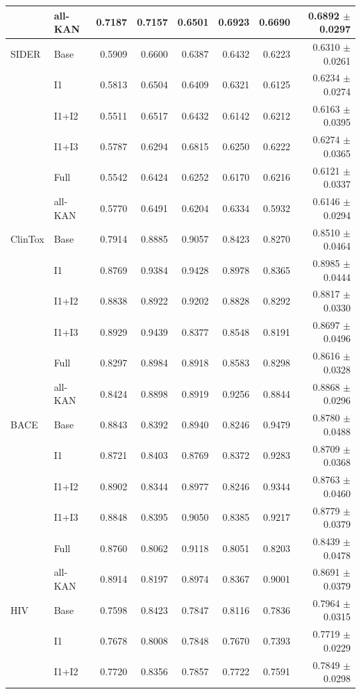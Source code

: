 \begin{landscape}
\begin{longtable}{llrrrrrr}
 & all-KAN & 0.7187 & 0.7157 & 0.6501 & 0.6923 & 0.6690 & 0.6892 $\pm$ 0.0297 \\
\midrule
SIDER & Base & 0.5909 & 0.6600 & 0.6387 & 0.6432 & 0.6223 & 0.6310 $\pm$ 0.0261 \\
 & I1 & 0.5813 & 0.6504 & 0.6409 & 0.6321 & 0.6125 & 0.6234 $\pm$ 0.0274 \\
 & I1+I2 & 0.5511 & 0.6517 & 0.6432 & 0.6142 & 0.6212 & 0.6163 $\pm$ 0.0395 \\
 & I1+I3 & 0.5787 & 0.6294 & 0.6815 & 0.6250 & 0.6222 & 0.6274 $\pm$ 0.0365 \\
 & Full & 0.5542 & 0.6424 & 0.6252 & 0.6170 & 0.6216 & 0.6121 $\pm$ 0.0337 \\
 & all-KAN & 0.5770 & 0.6491 & 0.6204 & 0.6334 & 0.5932 & 0.6146 $\pm$ 0.0294 \\
\midrule
ClinTox & Base & 0.7914 & 0.8885 & 0.9057 & 0.8423 & 0.8270 & 0.8510 $\pm$ 0.0464 \\
 & I1 & 0.8769 & 0.9384 & 0.9428 & 0.8978 & 0.8365 & 0.8985 $\pm$ 0.0444 \\
 & I1+I2 & 0.8838 & 0.8922 & 0.9202 & 0.8828 & 0.8292 & 0.8817 $\pm$ 0.0330 \\
 & I1+I3 & 0.8929 & 0.9439 & 0.8377 & 0.8548 & 0.8191 & 0.8697 $\pm$ 0.0496 \\
 & Full & 0.8297 & 0.8984 & 0.8918 & 0.8583 & 0.8298 & 0.8616 $\pm$ 0.0328 \\
 & all-KAN & 0.8424 & 0.8898 & 0.8919 & 0.9256 & 0.8844 & 0.8868 $\pm$ 0.0296 \\
\midrule
BACE & Base & 0.8843 & 0.8392 & 0.8940 & 0.8246 & 0.9479 & 0.8780 $\pm$ 0.0488 \\
 & I1 & 0.8721 & 0.8403 & 0.8769 & 0.8372 & 0.9283 & 0.8709 $\pm$ 0.0368 \\
 & I1+I2 & 0.8902 & 0.8344 & 0.8977 & 0.8246 & 0.9344 & 0.8763 $\pm$ 0.0460 \\
 & I1+I3 & 0.8848 & 0.8395 & 0.9050 & 0.8385 & 0.9217 & 0.8779 $\pm$ 0.0379 \\
 & Full & 0.8760 & 0.8062 & 0.9118 & 0.8051 & 0.8203 & 0.8439 $\pm$ 0.0478 \\
 & all-KAN & 0.8914 & 0.8197 & 0.8974 & 0.8367 & 0.9001 & 0.8691 $\pm$ 0.0379 \\
\midrule
HIV & Base & 0.7598 & 0.8423 & 0.7847 & 0.8116 & 0.7836 & 0.7964 $\pm$ 0.0315 \\
 & I1 & 0.7678 & 0.8008 & 0.7848 & 0.7670 & 0.7393 & 0.7719 $\pm$ 0.0229 \\
 & I1+I2 & 0.7720 & 0.8356 & 0.7857 & 0.7722 & 0.7591 & 0.7849 $\pm$ 0.0298 \\

\end{longtable}
\end{landscape}
